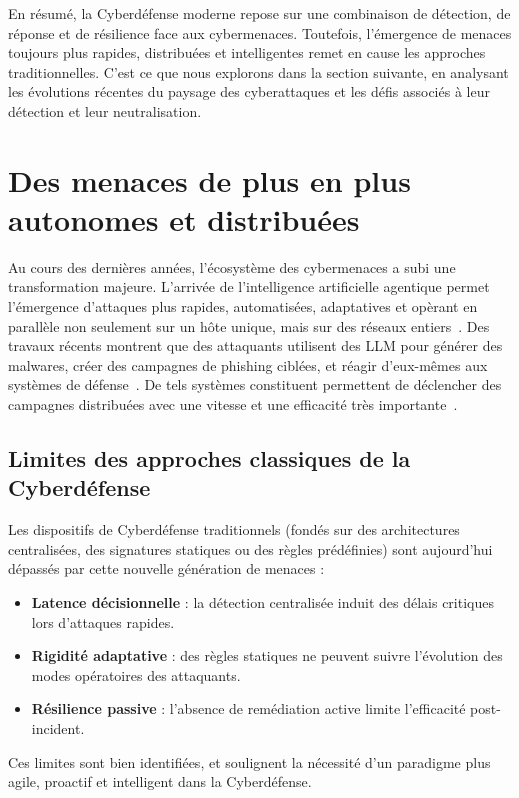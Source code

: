 \noindent
En résumé, la Cyberdéfense moderne repose sur une combinaison de détection, de réponse et de résilience face aux cybermenaces. Toutefois, l'émergence de menaces toujours plus rapides, distribuées et intelligentes remet en cause les approches traditionnelles. C'est ce que nous explorons dans la section suivante, en analysant les évolutions récentes du paysage des cyberattaques et les défis associés à leur détection et leur neutralisation.


\section{Des menaces de plus en plus autonomes et distribuées}\label{sec:evolution-menaces}

Au cours des dernières années, l'écosystème des cybermenaces a subi une transformation majeure. L'arrivée de l'intelligence artificielle agentique permet l'émergence d'attaques plus rapides, automatisées, adaptatives et opèrant en parallèle non seulement sur un hôte unique, mais sur des réseaux entiers~\cite{Cohen2020}. Des travaux récents montrent que des attaquants utilisent des \ac{LLM} pour générer des malwares, créer des campagnes de phishing ciblées, et réagir d'eux-mêmes aux systèmes de défense~\cite{AutoAttacker2024}. De tels systèmes constituent permettent de déclencher des campagnes distribuées avec une vitesse et une efficacité très importante~\cite{AgenticAIThreats2025}.

\subsection*{Limites des approches classiques de la Cyberdéfense}

Les dispositifs de Cyberdéfense traditionnels (fondés sur des architectures centralisées, des signatures statiques ou des règles prédéfinies) sont aujourd'hui dépassés par cette nouvelle génération de menaces :
\begin{itemize}
    \item \textbf{Latence décisionnelle} : la détection centralisée induit des délais critiques lors d'attaques rapides.
    \item \textbf{Rigidité adaptative} : des règles statiques ne peuvent suivre l'évolution des modes opératoires des attaquants.
    \item \textbf{Résilience passive} : l'absence de remédiation active limite l'efficacité post-incident.
\end{itemize}
Ces limites sont bien identifiées, et soulignent la nécessité d'un paradigme plus agile, proactif et intelligent dans la Cyberdéfense.

